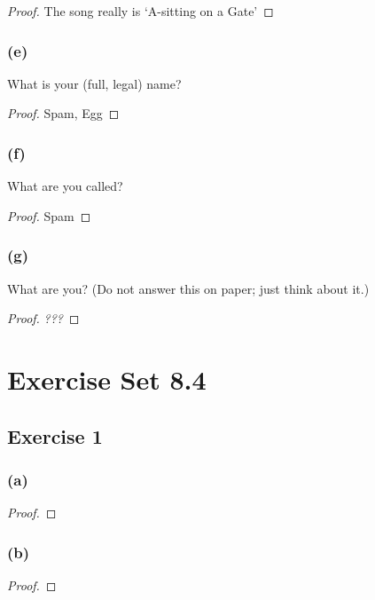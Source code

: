 \documentclass[14pt]{extarticle}
\begin{document}
\begin{proof}
The song really is ‘A-sitting on a Gate’
\end{proof}

\subsubsection{(e)}
What is your (full, legal) name?

\begin{proof}
Spam, Egg
\end{proof}

\subsubsection{(f)}
What are you called?

\begin{proof}
Spam
\end{proof}

\subsubsection{(g)}
What are you? (Do not answer this on paper; just think about it.)

\begin{proof}
{\it ???}
\end{proof}

\section{Exercise Set 8.4}

\subsection{Exercise 1}

\subsubsection{(a)}

\begin{proof}

\end{proof}

\subsubsection{(b)}

\begin{proof}

\end{proof}
\end{document}

